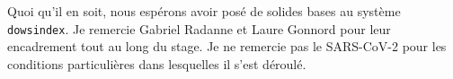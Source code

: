 \documentclass[a4paper]{report}
\theoremstyle{definition}
\newcommand{\dowsindex}{\texttt{dowsindex}\xspace}
\begin{document}
Quoi qu'il en soit, nous espérons avoir posé de solides bases au système \dowsindex. Je remercie Gabriel Radanne et Laure Gonnord pour leur encadrement tout au long du stage. Je ne remercie pas le SARS-CoV-2 pour les conditions particulières dans lesquelles il s'est déroulé.


\printbibliography
\end{document}
